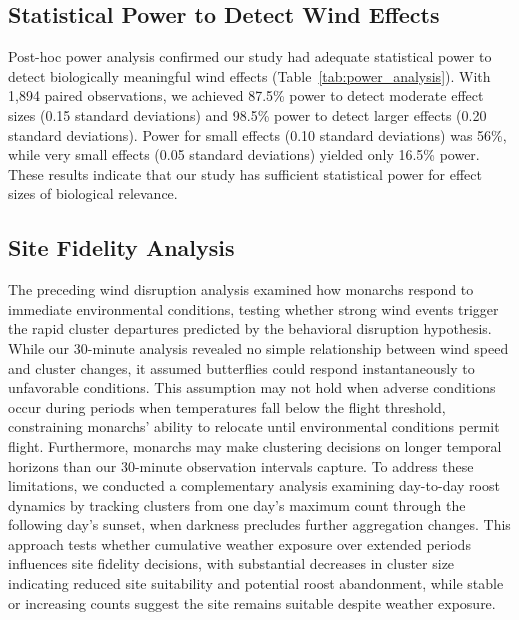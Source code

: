 \subsection{Statistical Power to Detect Wind Effects}

Post-hoc power analysis confirmed our study had adequate statistical power to detect biologically meaningful wind effects (Table~\ref{tab:power_analysis}). With 1,894 paired observations, we achieved 87.5\% power to detect moderate effect sizes (0.15 standard deviations) and 98.5\% power to detect larger effects (0.20 standard deviations). Power for small effects (0.10 standard deviations) was 56\%, while very small effects (0.05 standard deviations) yielded only 16.5\% power. These results indicate that our study has sufficient statistical power for effect sizes of biological relevance.



\subsection{Site Fidelity Analysis}

The preceding wind disruption analysis examined how monarchs respond to immediate environmental conditions, testing whether strong wind events trigger the rapid cluster departures predicted by the behavioral disruption hypothesis. While our 30-minute analysis revealed no simple relationship between wind speed and cluster changes, it assumed butterflies could respond instantaneously to unfavorable conditions. This assumption may not hold when adverse conditions occur during periods when temperatures fall below the flight threshold, constraining monarchs' ability to relocate until environmental conditions permit flight. Furthermore, monarchs may make clustering decisions on longer temporal horizons than our 30-minute observation intervals capture. To address these limitations, we conducted a complementary analysis examining day-to-day roost dynamics by tracking clusters from one day's maximum count through the following day's sunset, when darkness precludes further aggregation changes. This approach tests whether cumulative weather exposure over extended periods influences site fidelity decisions, with substantial decreases in cluster size indicating reduced site suitability and potential roost abandonment, while stable or increasing counts suggest the site remains suitable despite weather exposure.

